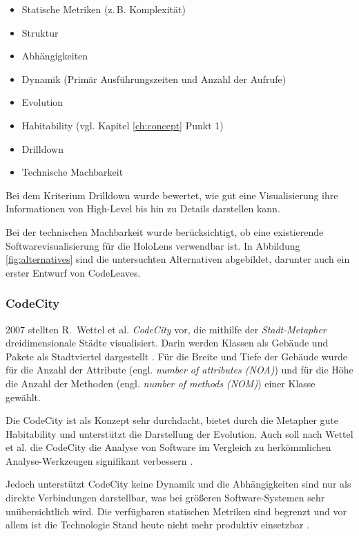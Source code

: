 \begin{itemize}
  \item Statische Metriken (z.\,B. Komplexität)
  \item Struktur
  \item Abhängigkeiten
  \item Dynamik (Primär Ausführungszeiten und Anzahl der Aufrufe)
  \item Evolution
  \item Habitability (vgl. Kapitel \ref{ch:concept} Punkt 1)
  \item Drilldown
  \item Technische Machbarkeit
\end{itemize}

Bei dem Kriterium Drilldown wurde bewertet, wie gut eine Visualisierung ihre Informationen von High-Level bis hin zu Details darstellen kann.

Bei der technischen Machbarkeit wurde berücksichtigt, ob eine existierende Softwarevisualisierung für die HoloLens verwendbar ist. In Abbildung \ref{fig:alternatives} sind die untersuchten Alternativen abgebildet, darunter auch ein erster Entwurf von CodeLeaves.

\subsubsection*{CodeCity}
2007 stellten R.\ Wettel et al. \textit{CodeCity} vor, die mithilfe der \textit{Stadt-Metapher} dreidimensionale Städte visualisiert. Darin werden Klassen als Gebäude und Pakete als Stadtviertel dargestellt \cite{wettel2007program, wettel2008visual, wettel2011software}. Für die Breite und Tiefe der Gebäude wurde für die Anzahl der Attribute (engl. \emph{number of attributes (NOA)}) und für die Höhe die Anzahl der Methoden (engl. \emph{number of methods (NOM)}) einer Klasse gewählt.

Die CodeCity ist als Konzept sehr durchdacht, bietet durch die Metapher gute Habitability und unterstützt die Darstellung der Evolution. Auch soll nach Wettel et al. die CodeCity die Analyse von Software im Vergleich zu herkömmlichen Analyse-Werkzeugen signifikant verbessern \cite{wettel2011software}.

Jedoch unterstützt CodeCity keine Dynamik und die Abhängigkeiten sind nur als direkte Verbindungen darstellbar, was bei größeren Software-Systemen sehr unübersichtlich wird. Die verfügbaren statischen Metriken sind begrenzt und vor allem ist die Technologie Stand heute nicht mehr produktiv einsetzbar \cite{puetz2017softwarevisualisierung}.

